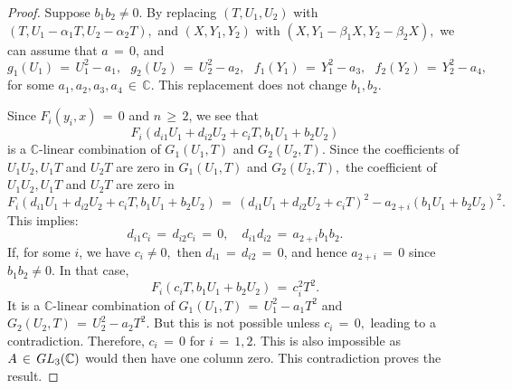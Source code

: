 \documentclass[10pt,a4paper]{amsart}
\begin{document}
\begin{proof}
Suppose $b_1b_2\neq0.$
By replacing $(T, U_{1},U_{2})$ with $ (T,U_{1}-\alpha_{1}T,U_{2}-\alpha_{2}T),$ and $ (X,Y_{1}, Y_{2})$ with $ (X,Y_{1}-\beta_{1}X ,Y_{2}-\beta_{2}X),$ we can assume that $a\,=\,0$, and
$$ g_{1}(U_{1})\,=\, U_{1}^{2}-a_{1}, \,\,\,\, g_{2}(U_{2})\,=\, U_{2}^{2}- a_{2},\,\,\,\, f_{1}(Y_{1})\,=\, Y_{1}^{2}- a_{3},\,\,\,\, f_{2}(Y _{2})\,=\, Y_{2}^2 - a_{4},$$
for some $ a_{1}, a_{2}, a_{3}, a_{4} \,\in\, \mathbb{C}$. This replacement does not change $b_{1},b_{2}.$ 

Since $F_{i}(y_{i},x)\,=\,0$ and $n\,\geq\, 2$, we see that  
\begin{equation*}
F_{i}(d_{i1}U_{1}+d_{i2}U_{2}+c_{i}T, b_{1}U_{1}+ b_{2}U_{2})
\end{equation*}
is a $\mathbb{C}$-linear combination of $G_{1}(U_{1},T)$ and $ G_{2}(U_{2}, T).$ Since the coefficients of $ U_{1}U_{2}, U_{1}T$ and $ U_{2}T$ are zero in $ G_{1}(U_{1},T)$ and $ G_{2}(U_{2},T),$ the coefficient of $ U_{1}U_{2}, U_{1}T$ and $U_{2}T$ are zero in 
 $$ F_{i}(d_{i1}U_{1}+d_{i2}U_{2}+c_{i}T, b_{1}U_{1}+ b_{2}U_{2}) \,=\, (d_{i1}U_{1}+ d_{i2}U_{2} + c_{i}T)^{2}- a_{2+i}(b_{1}U_{1}+b_{2}U_{2})^{2}.$$
This implies: 
\begin{equation*}
d_{i1} c_{i}\,=\, d_{i2}c_{i}\,=\,0, \quad
 d_{i1}d_{i2}\,=\,a_{2+i}b_{1}b_{2}.
\end{equation*}
If, for some $i$, we have $c_{i} \neq 0,$ then $d_{i1}\,=\,d_{i2}\,=\,0 $, and hence $a_{2+i}\,=\,0$ since $b_1b_2\neq 0.$ In that case, 
\begin{equation*}
F_{i}(c_{i}T, b_{1}U_{1}+b_{2}U_{2}) \,=\, c_{i}^{2}T^{2}.
\end{equation*}
It is a $\mathbb{C}$-linear combination of $G_{1}(U_{1},T)\,=\,U_{1}^{2}-a_{1}T^2$ and $G_{2}(U_{2},T)\,=\,U_{2}^{2}-a_{2}T^2.  $ But this is not possible unless $c_{i}\,=\,0,$ leading to a contradiction. Therefore, $c_{i}\,=\,0$ for $i \,=\, 1,2.$ This is also impossible as $A\,\in\, \textnormal{GL}_{3}(\mathbb{C})$ would then have one column zero. This contradiction proves the result.      
\end{proof}
\end{document}
